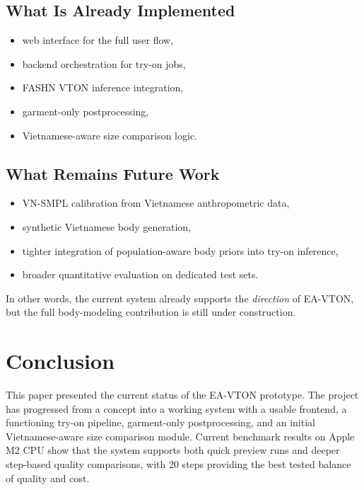 \documentclass[a4paper,10pt,twocolumn]{article}
\begin{document}
\subsection{What Is Already Implemented}

\begin{itemize}[leftmargin=*, itemsep=2pt]
  \item web interface for the full user flow,
  \item backend orchestration for try-on jobs,
  \item FASHN VTON inference integration,
  \item garment-only postprocessing,
  \item Vietnamese-aware size comparison logic.
\end{itemize}

\subsection{What Remains Future Work}

\begin{itemize}[leftmargin=*, itemsep=2pt]
  \item VN-SMPL calibration from Vietnamese anthropometric data,
  \item synthetic Vietnamese body generation,
  \item tighter integration of population-aware body priors into try-on inference,
  \item broader quantitative evaluation on dedicated test sets.
\end{itemize}

In other words, the current system already supports the \textit{direction} of EA-VTON, but the full body-modeling contribution is still under construction.

\section{Conclusion}
\label{sec:conclusion}

This paper presented the current status of the EA-VTON prototype. The project has progressed from a concept into a working system with a usable frontend, a functioning try-on pipeline, garment-only postprocessing, and an initial Vietnamese-aware size comparison module. Current benchmark results on Apple M2 CPU show that the system supports both quick preview runs and deeper step-based quality comparisons, with 20 steps providing the best tested balance of quality and cost.
\end{document}
